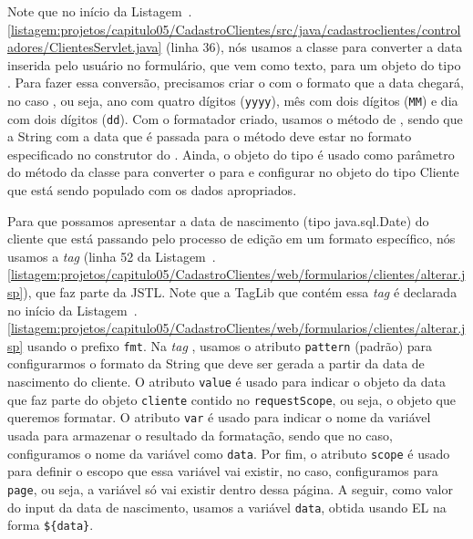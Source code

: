 Note que no início da Listagem~\thechapter.\ref{listagem:projetos/capitulo05/CadastroClientes/src/java/cadastroclientes/controladores/ClientesServlet.java} (linha 36), nós usamos a classe\linebreak%
 para converter a data inserida pelo usuário no formulário, que vem como texto, para um objeto do tipo . Para fazer essa conversão, precisamos criar o  com o formato que a data chegará, no caso , ou seja, ano com quatro dígitos (\texttt{yyyy}), mês com dois dígitos (\texttt{MM}) e dia com dois dígitos (\texttt{dd}). Com o formatador criado, usamos o método  de , sendo que a String com a data que é passada para o método  deve estar no formato especificado no construtor do . Ainda, o objeto do tipo  é usado como parâmetro do método  da classe  para converter o  para  e configurar no objeto do tipo Cliente que está sendo populado com os dados apropriados.


Para que possamos apresentar a data de nascimento (tipo java.sql.Date) do cliente que está passando pelo processo de edição em um formato específico, nós usamos a \textit{tag}  (linha 52 da Listagem~\thechapter.\ref{listagem:projetos/capitulo05/CadastroClientes/web/formularios/clientes/alterar.jsp}), que faz parte da JSTL. Note que a TagLib que contém essa \textit{tag} é declarada no início da Listagem~\thechapter.\ref{listagem:projetos/capitulo05/CadastroClientes/web/formularios/clientes/alterar.jsp} usando o prefixo \texttt{fmt}. Na \textit{tag} , usamos o atributo \texttt{pattern} (padrão) para configurarmos o formato da String que deve ser gerada a partir da data de nascimento do cliente. O atributo \texttt{value} é usado para indicar o objeto da data que faz parte do objeto \texttt{cliente} contido no \texttt{requestScope}, ou seja, o objeto que queremos formatar. O atributo \texttt{var} é usado para indicar o nome da variável usada para armazenar o resultado da formatação, sendo que no caso, configuramos o nome da variável como \texttt{data}. Por fim, o atributo \texttt{scope} é usado para definir o escopo que essa variável vai existir, no caso, configuramos para \texttt{page}, ou seja, a variável só vai existir dentro dessa página. A seguir, como valor do input da data de nascimento, usamos a variável \texttt{data}, obtida usando EL na forma \texttt{\$\{data\}}.

